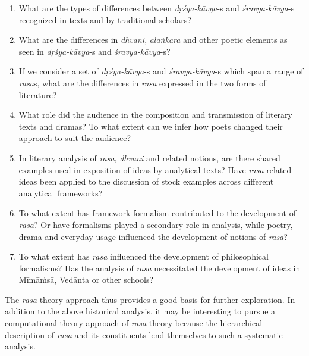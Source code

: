 \begin{enumerate}
\itemsep=1pt
\item What are the types of differences between \textsl{dṛśya-kāvya}-s and \textsl{śravya-kāvya}-s recognized in texts and by traditional scholars?
\item What are the differences in \textsl{dhvani}, \textsl{alaṅkāra} and other poetic elements as seen in \textsl{dṛśya-kāvya}-s and \textsl{śravya-kāvya}-s?
\item If we consider a set of \textsl{dṛśya-kāvya}-s and \textsl{śravya-kāvya}-s which span a range of \textsl{rasa}s, what are the differences in \textsl{rasa} expressed in the two forms of literature?
\item What role did the audience in the composition and transmission of literary texts and dramas? To what extent can we infer how poets changed their approach to suit the audience? 
\item In literary analysis of \textsl{rasa}, \textsl{dhvani} and related notions, are there shared examples used in exposition of ideas by analytical texts? Have \textsl{rasa}-related ideas been applied to the discussion of stock examples across different analytical frameworks?
\item To what extent has framework formalism contributed to the development of \textsl{rasa}? Or have formalisms played a secondary role in analysis, while poetry, drama and everyday usage influenced the development of notions of \textsl{rasa}? 
\item To what extent has \textsl{rasa} influenced the development of philosophical formalisms? Has the analysis of \textsl{rasa} necessitated the development of ideas in Mīmāṁsā, Vedānta or other schools?
\end{enumerate}

The \textsl{rasa} theory approach thus provides a good basis for further exploration. In addition to the above historical analysis, it may be interesting to pursue a computational theory approach of \textsl{rasa} theory because the hierarchical description of \textsl{rasa} and its constituents lend themselves to such a systematic analysis.

